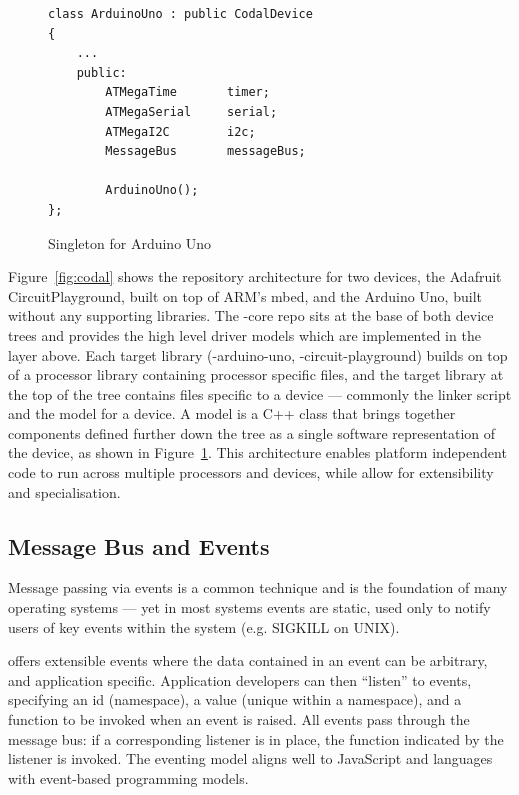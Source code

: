 \begin{figure}
\begin{lstlisting}
class ArduinoUno : public CodalDevice
{
    ...
    public:
        ATMegaTime       timer;
        ATMegaSerial     serial;
        ATMegaI2C        i2c;
        MessageBus       messageBus;

        ArduinoUno();
};
\end{lstlisting}
\caption{\label{fig:codalSingleton}Singleton for Arduino Uno}
\end{figure}

Figure~\ref{fig:codal} shows the repository architecture for two \CO devices, the Adafruit CircuitPlayground, built on top of ARM's mbed, and the Arduino Uno, built without any supporting libraries. The \COLN-core repo sits at the base of both device trees and provides the high level driver models which are implemented in the layer above. Each target library (\COLN-arduino-uno, \COLN-circuit-playground) builds on top of a processor library containing processor specific files, and the target library at the top of the tree contains files specific to a device --- commonly the linker script and the model for a device. A model is a C++ class that brings together components defined further down the tree as a single software representation of the device,
as shown in Figure~\ref{fig:codalSingleton}.
This architecture enables platform independent code to run across multiple processors and devices, while allow for extensibility and specialisation.

\subsection{Message Bus and Events}

Message passing via events is a common technique and is the foundation of many operating systems --- yet in most systems events are static, used only to notify users of key events within the system (e.g. SIGKILL on UNIX).

\CO offers extensible events where the data contained in an event can be arbitrary, and application specific. Application developers can then ``listen'' to events, specifying an id (namespace), a value (unique within a namespace), and a function to be invoked when an event is raised. All events pass through the message bus: if a corresponding listener is in place, the function indicated by the listener is invoked. The eventing model aligns well to JavaScript and languages with event-based programming models.


